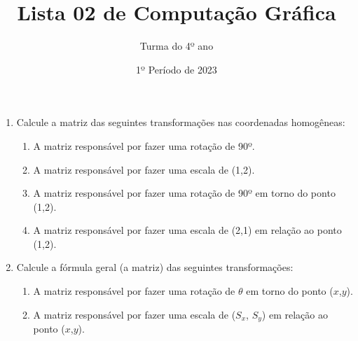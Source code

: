 \documentclass[12pt]{article}
\title{Lista 02 de Computação Gráfica}
\date{1º Período de 2023}
\author{Turma do 4º ano}
\begin{document}
\maketitle

\begin{enumerate}


\item Calcule a matriz das seguintes transformações nas coordenadas homogêneas:

\begin{enumerate}

\item A matriz responsável por fazer uma rotação de 90º.

\item A matriz responsável por fazer uma escala de (1,2).

\item A matriz responsável por fazer uma rotação de 90º em torno do ponto (1,2).

\item A matriz responsável por fazer uma escala de (2,1) em relação ao ponto (1,2).

\end{enumerate}

\item Calcule a fórmula geral (a matriz) das seguintes transformações:

\begin{enumerate}

\item A matriz responsável por fazer uma rotação de $\theta$ em torno do ponto ($x$,$y$).

\item A matriz responsável por fazer uma escala de ($S_x$, $S_y$) em relação ao ponto ($x$,$y$).

\end{enumerate}


\end{enumerate}
\end{document}
